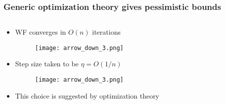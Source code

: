 \documentclass[compress,
mathserif,wide,%
]{beamer}
\begin{document}
\begin{frame}
	\frametitle{Generic optimization theory gives pessimistic bounds}

\begin{columns}

\begin{column}{0.92\textwidth}
\begin{itemize}
  \item[] WF converges in $O(n)$ iterations
  \pause

  \vspace{-1em}
  \begin{figure}
	\texttt{[image: arrow\_down\_3.png]} \qquad 
  \end{figure}

  \item[] Step size taken to be \alert{$\eta = O(1/n)$}

  \pause
  \vspace{-1em}
  \begin{figure}
	\texttt{[image: arrow\_down\_3.png]} \qquad 
  \end{figure}


  \item[] This choice is suggested by  optimization theory

  
\end{itemize}

\end{column}
\end{columns}

\end{frame}
\end{document}
